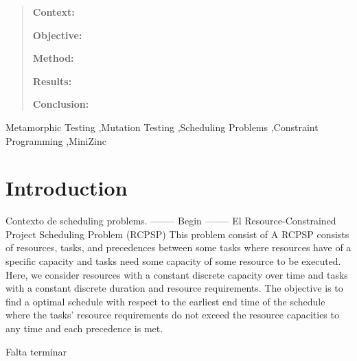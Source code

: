 \begin{frontmatter}






\begin{abstract}

  \textbf{Context:}

  \textbf{Objective:}

  \textbf{Method:}

  \textbf{Results:}

  \textbf{Conclusion:}

\end{abstract}


\begin{keyword}
 Metamorphic Testing \sep Mutation Testing \sep Scheduling Problems \sep Constraint Programming \sep MiniZinc
\end{keyword}

\end{frontmatter}

\section{Introduction}

Contexto de scheduling problems.
-------- Begin --------
El Resource-Constrained Project Scheduling Problem (RCPSP) \cite{herroelen1998resource, abdolshah2014review,hartmann2022updated}
This problem consist
of A RCPSP consists of resources, tasks, and precedences between some tasks where resources have of a specific capacity and tasks need some capacity of some resource to be executed.
 Here, we consider resources with a constant discrete capacity over time and tasks with a constant discrete duration and resource requirements.
 The objective is to find a optimal schedule with respect to the earliest end time of the schedule where the tasks' resource requirements do not exceed the resource capacities to any time and each precedence is met.


Falta terminar

